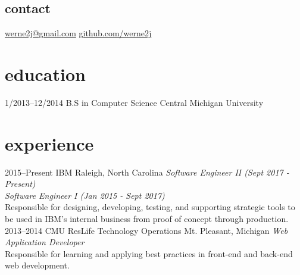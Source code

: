 \documentclass[]{friggeri-cv} %
\begin{document}


\begin{aside} %
\section{contact}
\href{mailto:werne2@gmail.com}{werne2j@gmail.com}
\href{github.com/werne2j}{github.com/werne2j}
~
\end{aside}


\section{education}

\begin{entrylist}

\entry
{1/2013--12/2014}
{B.S in Computer Science{\normalfont}}
{Central Michigan University}

\end{entrylist}


\section{experience}

\begin{entrylist}
\entry
{2015--Present}
{IBM}
{Raleigh, North Carolina}
{\emph{Software Engineer II (Sept 2017 - Present)} \\
\emph{Software Engineer I (Jan 2015 - Sept 2017)} \\
Responsible for designing, developing, testing, and supporting strategic tools to be used in IBM's internal business from proof of concept through production.}\\

\entry
{2013--2014}
{CMU ResLife Technology Operations}
{Mt. Pleasant, Michigan}
{\emph{Web Application Developer} \\
Responsible for learning and applying best practices in front-end and back-end web development.}\\

\end{entrylist}
\end{document}
